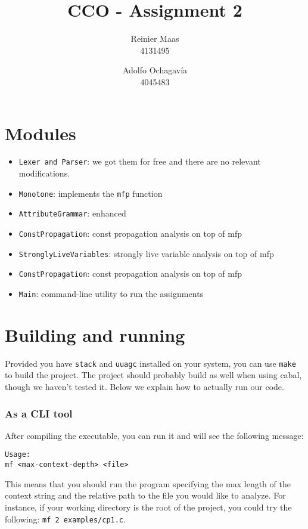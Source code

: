 \documentclass{article}
\author{
  Reinier Maas \\ 4131495
  \and
  Adolfo Ochagavía \\ 4045483
}
\title{CCO - Assignment 2}
\begin{document}
\maketitle

\section*{Modules}

\begin{itemize}
\item \texttt{Lexer and Parser}: we got them for free and there are no relevant modifications.
\item \texttt{Monotone}: implements the \texttt{mfp} function
\item \texttt{AttributeGrammar}: enhanced
\item \texttt{ConstPropagation}: const propagation analysis on top of mfp
\item \texttt{StronglyLiveVariables}: strongly live variable analysis on top of mfp
\item \texttt{ConstPropagation}: const propagation analysis on top of mfp
\item \texttt{Main}: command-line utility to run the assignments
\end{itemize}

\section*{Building and running}

Provided you have \texttt{stack} and \texttt{uuagc} installed on your system, you can use \texttt{make} to build the project. The project should probably build as well when using cabal, though we haven't tested it. Below we explain how to actually run our code.

\subsubsection*{As a CLI tool}

After compiling the executable, you can run it and will see the following message:

\begin{verbatim}
Usage:
mf <max-context-depth> <file>
\end{verbatim}

This means that you should run the program specifying the max length of the context string and the relative path to the file you would like to analyze. For instance, if your working directory is the root of the project, you could try the following: \texttt{mf 2 examples/cp1.c}.
\end{document}
